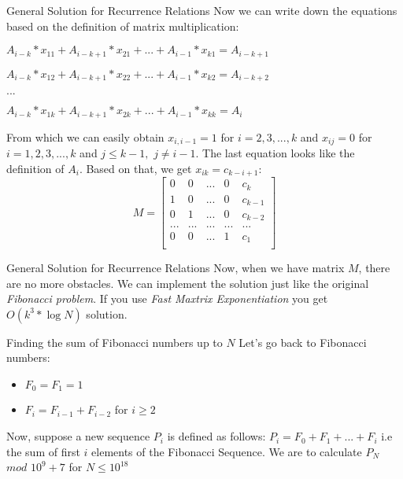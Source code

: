 \documentclass{beamer}
\begin{document}
\begin{frame}{General Solution for Recurrence Relations}
  Now we can write down the equations based on the definition of matrix multiplication:
  \pause \newline
  \centerline{$A_{i-k}*x_{11} + A_{i-k+1}*x_{21} + ... + A_{i-1}*x_{k1} = A_{i-k+1}$}
  \newline
  \centerline{$A_{i-k}*x_{12} + A_{i-k+1}*x_{22} + ... + A_{i-1}*x_{k2} = A_{i-k+2}$}
  \newline
  \centerline{$...$}
  \newline
  \centerline{$A_{i-k}*x_{1k} + A_{i-k+1}*x_{2k} + ... + A_{i-1}*x_{kk} = A_{i}$}
  \pause \newline\newline
  From which we can easily obtain $x_{i,i-1} = 1$ for $i = 2, 3, ..., k$ and 
  $x_{ij} = 0$ for $i = 1, 2, 3, ..., k$ and $j \leq k - 1,$ $j \neq i - 1$.
  \pause \newline
  The last equation looks like the definition of $A_i$. Based on that, we get $x_{ik} = c_{k-i+1}$:
  \[
    M = 
    \left[ {
      \begin{array}{ccccc}
        0 & 0 & ... & 0 & c_k \\
        1 & 0 & ... & 0 & c_{k-1} \\
        0 & 1 & ... & 0 & c_{k-2} \\
        ... & ... & ... & ... & ... \\
        0 & 0 & ... & 1 & c_1 \\
      \end{array} } 
    \right]
  \]
\end{frame}

\begin{frame}{General Solution for Recurrence Relations}
  Now, when we have matrix $M$, there are no more obstacles. 
  \newline
  We can implement the solution just like the original \textit{Fibonacci problem}.
  \pause \newline\newline
  If you use \textit{Fast Maxtrix Exponentiation} you get $O(k^3 * \log{N})$ solution.
\end{frame}

\begin{frame}{Finding the sum of Fibonacci numbers up to $N$}
  Let’s go back to Fibonacci numbers:
  \begin{itemize}
    \item $F_0 = F_1 = 1$
    \item $F_i = F_{i - 1} + F_{i - 2}$ for $i \geq 2$
  \end{itemize}
  \pause
  Now, suppose a new sequence $P_i$ is defined as follows:
  \newline
  $P_i = F_0 + F_1 + ... + F_i$
  \newline i.e the sum of first $i$ elements of the Fibonacci Sequence.
  \pause \newline We are to calculate $P_N$ $mod$ $10^9 + 7$ for $N \leq 10^{18}$
\end{frame}
\end{document}
